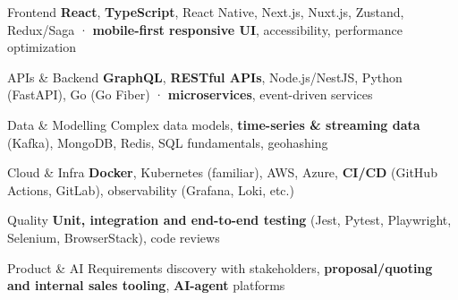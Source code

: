
\begin{cvskills}

  \cvskill
  {Frontend}
  {\textbf{React}, \textbf{TypeScript}, React Native, Next.js, Nuxt.js, Zustand, Redux/Saga · \textbf{mobile-first responsive UI}, accessibility, performance optimization}

  \cvskill
  {APIs \& Backend}
  {\textbf{GraphQL}, \textbf{RESTful APIs}, Node.js/NestJS, Python (FastAPI), Go (Go Fiber) · \textbf{microservices}, event-driven services}

  \cvskill
  {Data \& Modelling}
  {Complex data models, \textbf{time-series \& streaming data} (Kafka), MongoDB, Redis, SQL fundamentals, geohashing}

  \cvskill
  {Cloud \& Infra}
  {\textbf{Docker}, Kubernetes (familiar), AWS, Azure, \textbf{CI/CD} (GitHub Actions, GitLab), observability (Grafana, Loki, etc.)}

  \cvskill
  {Quality}
  {\textbf{Unit, integration and end-to-end testing} (Jest, Pytest, Playwright, Selenium, BrowserStack), code reviews}

  \cvskill
  {Product \& AI}
  {Requirements discovery with stakeholders, \textbf{proposal/quoting and internal sales tooling}, \textbf{AI-agent} platforms}

\end{cvskills}
